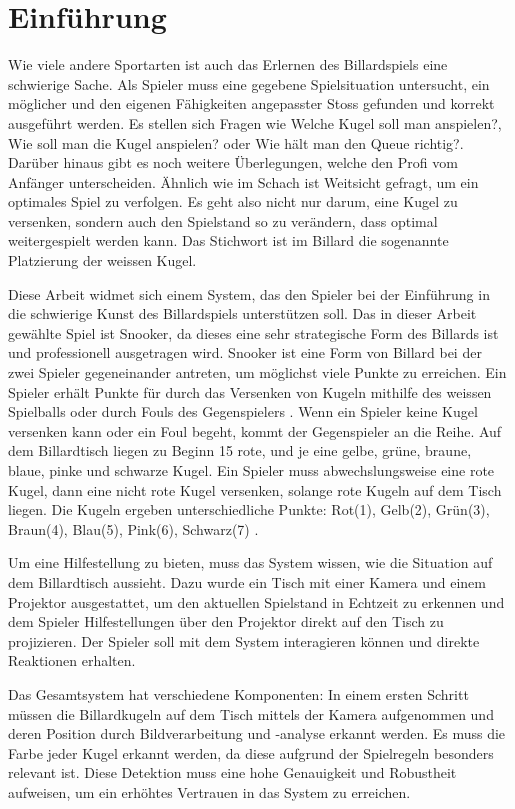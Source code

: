 \chapter{Einführung}\label{kap:introduction}
Wie viele andere Sportarten ist auch das Erlernen des Billardspiels eine schwierige Sache.
Als Spieler muss eine gegebene Spielsituation untersucht, ein möglicher und den eigenen Fähigkeiten angepasster Stoss
gefunden und korrekt ausgeführt werden.
Es stellen sich Fragen wie \glqq Welche Kugel soll man anspielen?\grqq{},
\glqq Wie soll man die Kugel anspielen?\grqq{} oder \glqq Wie hält man den Queue richtig?\grqq{}.
Darüber hinaus gibt es noch weitere Überlegungen, welche den Profi vom Anfänger unterscheiden.
Ähnlich wie im Schach ist Weitsicht gefragt, um ein optimales Spiel zu verfolgen.
Es geht also nicht nur darum, eine Kugel zu versenken, sondern auch den Spielstand so zu verändern,
dass optimal weitergespielt werden kann.
Das Stichwort ist im Billard die sogenannte Platzierung der weissen Kugel.

Diese Arbeit widmet sich einem System, das den Spieler bei der Einführung in die schwierige Kunst des Billardspiels unterstützen soll.
Das in dieser Arbeit gewählte Spiel ist Snooker, da dieses eine sehr strategische Form des Billards ist und professionell ausgetragen wird.
Snooker ist eine Form von Billard bei der zwei Spieler gegeneinander antreten, um möglichst viele Punkte zu erreichen.
Ein Spieler erhält Punkte für durch das Versenken von Kugeln mithilfe des weissen Spielballs oder durch Fouls des Gegenspielers \cite{stoppball:spielregel:snooker}.
Wenn ein Spieler keine Kugel versenken kann oder ein Foul begeht, kommt der Gegenspieler an die Reihe.
Auf dem Billardtisch liegen zu Beginn 15 rote, und je eine gelbe, grüne, braune, blaue, pinke und schwarze Kugel.
Ein Spieler muss abwechslungsweise eine rote Kugel, dann eine nicht rote Kugel versenken, solange rote Kugeln auf dem Tisch liegen.
Die Kugeln ergeben unterschiedliche Punkte: Rot(1), Gelb(2), Grün(3), Braun(4), Blau(5), Pink(6), Schwarz(7) \cite{stoppball:spielregel:snooker}.

Um eine Hilfestellung zu bieten, muss das System wissen, wie die Situation auf dem Billardtisch aussieht.
Dazu wurde ein Tisch mit einer Kamera und einem Projektor ausgestattet, um den aktuellen Spielstand in Echtzeit
zu erkennen und dem Spieler Hilfestellungen über den Projektor direkt auf den Tisch zu projizieren.
Der Spieler soll mit dem System interagieren können und direkte Reaktionen erhalten.

Das Gesamtsystem hat verschiedene Komponenten: In einem ersten Schritt müssen die Billardkugeln auf dem Tisch mittels der Kamera
aufgenommen und deren Position durch Bildverarbeitung und -analyse erkannt werden.
Es muss die Farbe jeder Kugel erkannt werden, da diese aufgrund der Spielregeln besonders relevant ist.
Diese Detektion muss eine hohe Genauigkeit und Robustheit aufweisen, um ein erhöhtes Vertrauen in das System zu erreichen.

